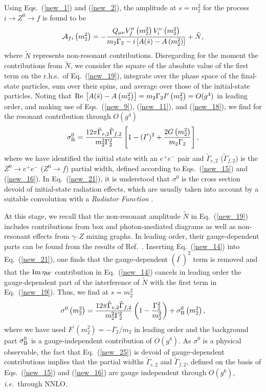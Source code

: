 \documentclass[a4paper,12pt]{article}
\begin{document}
Using Eqs.~(\ref{new_1}) and (\ref{new_2}), the amplitude at $s=m_2^2$ for the
process $i\to Z^0\to f$ is found to be
\begin{equation}
\label{new_19}
{\cal A}_{fi}\left(m_2^2\right)
=-\frac{Q_{\mu\nu}V_f^\mu\left(m_2^2\right)V_i^\nu\left(m_2^2\right)}
{m_2\Gamma_2-i\left[A(\bar s)-A\left(m_2^2\right)\right]}
+\tilde N,
\end{equation}
where $\tilde N$ represents non-resonant contributions.
Disregarding for the moment the contributions from $\tilde N$, we consider the
square of the absolute value of the first term on the r.h.s.\ of
Eq.~(\ref{new_19}),
integrate over the phase space of the final-state particles, sum over their
spins, and average over those of the initial-state particles.
Noting that
${\rm Re}\,\left[A(\bar s)-A\left(m_2^2\right)\right]
=m_2\Gamma_2I^\prime\left(m_2^2\right)=O(g^4)$ in leading order, and making
use of Eqs.~(\ref{new_9}), (\ref{new_11}), and (\ref{new_18}), we find for the
resonant contribution through $O(g^4)$ 
\begin{equation}
\label{new_21}
\sigma_{\rm R}^0=\frac{12\pi\tilde\Gamma_{e,2}\tilde\Gamma_{f,2}}
{m_2^2\Gamma^2_2}
\left[1-(I^\prime)^2+\frac{2G\left(m_2^2\right)}{m_2\Gamma_2}\right],
\end{equation}
where we have identified the initial state with an $e^+e^-$ pair and 
$\tilde\Gamma_{e,2}$ ($\tilde\Gamma_{f,2}$) is the $Z^0\to e^+e^-$
($Z^0 \to f$) partial width, defined according to
Eqs.~(\ref{new_15}) and (\ref{new_16}).
In Eq.~(\ref{new_21}), it is understood that $\sigma^0$ is the cross section
devoid of initial-state radiation effects, which are usually taken into
account by a suitable convolution with a {\it Radiator Function} \cite{pdg}. 

At this stage, we recall that the non-resonant amplitude $\tilde N$ in
Eq.~(\ref{new_19}) includes contributions from box and photon-mediated
diagrams as well as non-resonant effects from $\gamma$--$Z$ mixing graphs.
In leading order, their gauge-dependent parts can be found from the results of
Ref.~\cite{deg}.
Inserting Eq.~(\ref{new_14}) into Eq.~(\ref{new_21}), one finds that the
gauge-dependent $(I^\prime)^2$ term is removed and that the ${\rm Im}\,\eta_W$
contribution in Eq.~(\ref{new_14}) cancels in leading order the
gauge-dependent part of the interference of $\tilde N$ with the first term in
Eq.~(\ref{new_19}).
Thus, we find at $s=m^2_2$ 
\begin{equation}
\label{new_25}
\sigma^0\left(m^2_2\right)
=\frac{12\pi\tilde\Gamma_{e,2}\tilde\Gamma_{f,2}}{m^2_2\Gamma^2_2}
\left(1-\frac{\Gamma^2_2}{m^2_2}\right)+\sigma_{\rm B}^0\left(m^2_2\right),
\end{equation}
where we have used $F^\prime\left(m^2_2\right)=-\Gamma_2/m_2$ in leading 
order and the background part $\sigma_{\rm B}^0$ is a gauge-independent
contribution of $O(g^4)$.
As $\sigma^0$ is a physical observable, the fact that Eq.~(\ref{new_25}) is
devoid of gauge-dependent contributions implies that the partial widths 
$\tilde\Gamma_{e,2}$ and $\tilde\Gamma_{f,2}$, defined on the basis of
Eqs.~(\ref{new_15}) and (\ref{new_16}) are gauge independent through $O(g^6)$,
{\it i.e.}\ through NNLO.
\end{document}
